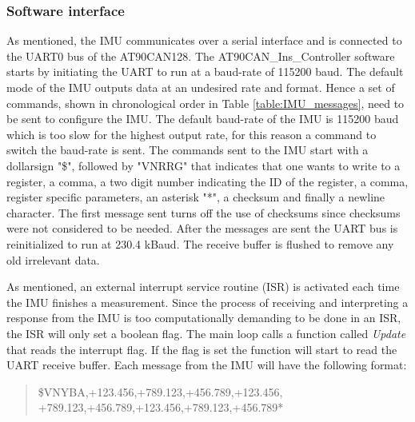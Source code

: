 \subsubsection{Software interface}
As mentioned, the IMU communicates over a serial interface and is connected to the UART0 bus of the AT90CAN128. The AT90CAN\_Ins\_Controller software starts by initiating the UART to run at a baud-rate of 115200 baud. \newline
The default mode of the IMU outputs data at an undesired rate and format. Hence a set of commands, shown in chronological order in Table \ref{table:IMU_messages}, need to be sent to configure the IMU. The default baud-rate of the IMU is 115200 baud which is too slow for the highest output rate, for this reason a command to switch the baud-rate is sent. \newline
The commands sent to the IMU start with a dollarsign "\$", followed by "VNRRG" that indicates that one wants to write to a register, a comma, a two digit number indicating the ID of the register, a comma, register specific parameters, an asterisk "*", a checksum and finally a newline character. 
The first message sent turns off the use of checksums since checksums were not considered to be needed. \newline
After the messages are sent the UART bus is reinitialized to run at 230.4 kBaud. The receive buffer is flushed to remove any old irrelevant data.

As mentioned, an external interrupt service routine (ISR) is activated each time the IMU finishes a measurement. Since the process of receiving and interpreting a response from the IMU is too computationally demanding to be done in an ISR, the ISR will only set a boolean flag. \newline
The main loop calls a function called \emph{Update} that reads the interrupt flag. If the flag is set the function will start to read the UART receive buffer. Each message from the IMU will have the following format: 

\begin{quote}
   \$VNYBA,+123.456,+789.123,+456.789,+123.456, \newline
   +789.123,+456.789,+123.456,+789.123,+456.789*
\end{quote}

